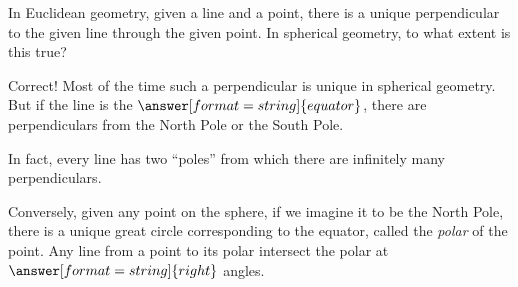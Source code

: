 \documentclass{ximera}
\begin{document}
%
\begin{problem}
In Euclidean geometry, given a line and a point, there is a unique perpendicular to the given line through the given point.  In spherical geometry, to what extent is this true? 
\begin{multipleChoice}
\end{multipleChoice}
\begin{problem}
Correct!  Most of the time such a perpendicular is unique in spherical geometry.  But if the line is the $\answer[format=string]{equator}$, there are 
 perpendiculars from the North Pole or the South Pole.  
\begin{problem}
In fact, every line has two ``poles'' from which there are infinitely many perpendiculars.  

Conversely, given any point on the sphere, if we imagine it to be the North Pole, there is a unique great circle corresponding to the equator, called the \emph{polar} of the point.  Any line from a point to its polar intersect the polar at $\answer[format=string]{right}$ angles.  
\end{problem} 
\end{problem} 
\end{problem}
\end{document}
